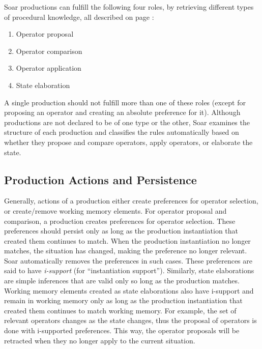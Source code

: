 Soar productions can fulfill the following four roles, by retrieving
different types of procedural knowledge, all described on page \pageref{LIST:4KnowledgeTypes}:\vspace{-10pt}
\begin{enumerate}
\item Operator proposal\vspace{-10pt}
\item Operator comparison\vspace{-10pt}
\item Operator application\vspace{-10pt}
\item State elaboration
\end{enumerate}

A single production should not fulfill more than one of these roles
(except for proposing an operator and creating an absolute preference
for it). Although productions are not declared to be of one type or the
other, Soar examines the structure of each production and classifies the
rules automatically based on whether they propose and compare operators,
apply operators, or elaborate the state. 

\subsection{Production Actions and Persistence}
\label{ARCH-prefmem-persistence}
\label{PAGE:O-support}

Generally, actions of a production either create preferences for
operator selection, or create/remove working memory elements.  For
operator proposal and comparison, a production creates preferences for
operator selection.  These preferences should persist only as long as
the production instantiation that created them continues to match.  When
the production instantiation no longer matches, the situation has
changed, making the preference no longer relevant.  Soar automatically
removes the preferences in such cases.  These preferences are said to
have \emph{i-support} (for ``instantiation support'').  Similarly, state
elaborations are simple inferences that are valid only so long as the
production matches.  Working memory elements created as state
elaborations also have i-support and remain in working memory only as
long as the production instantiation that created them continues to
match working memory.  For example, the set of relevant operators changes
as the state changes, thus the proposal of operators is done with
i-supported preferences. This way, the operator proposals will be
retracted when they no longer apply to the current situation.

